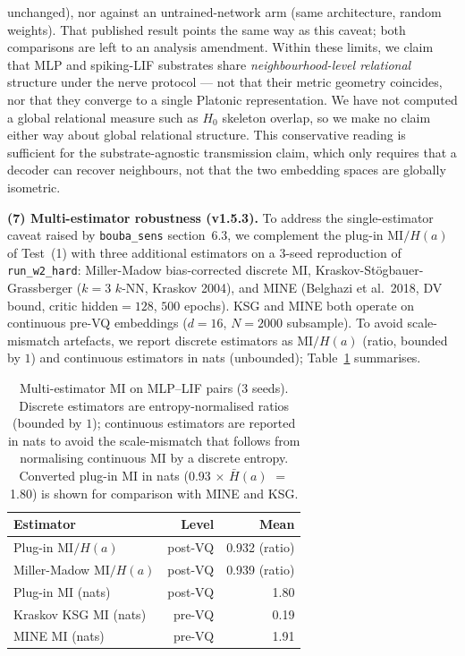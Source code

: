 \documentclass[10pt,twocolumn]{article}
\begin{document}
unchanged), nor against an untrained-network arm (same architecture,
random weights). That published result points the same way as this
caveat; both comparisons are left to an analysis amendment. Within these limits, we claim
that MLP and spiking-LIF substrates share \emph{neighbourhood-level
relational} structure under the nerve protocol --- not that their
metric geometry coincides, nor that they converge to a single Platonic
representation. We have not computed a global relational measure such
as $H_0$ skeleton overlap, so we make no claim either way about global
relational structure. This conservative reading is sufficient for the
substrate-agnostic transmission claim, which only requires that a
decoder can recover neighbours, not that the two embedding spaces are
globally isometric.

\textbf{(7) Multi-estimator robustness (v1.5.3).} To address the
single-estimator caveat raised by \texttt{bouba\_sens} section~6.3,
we complement the plug-in $\mathrm{MI}/H(a)$ of Test~(1) with three
additional estimators on a 3-seed reproduction of
\texttt{run\_w2\_hard}: Miller-Madow bias-corrected discrete MI,
Kraskov-St\"ogbauer-Grassberger ($k{=}3$ $k$-NN, Kraskov 2004), and
MINE (Belghazi et al.\ 2018, DV bound, critic hidden${=}128$,
$500$ epochs). KSG and MINE both operate on continuous pre-VQ
embeddings ($d{=}16$, $N{=}2000$ subsample). To avoid
scale-mismatch artefacts, we report discrete estimators as
$\mathrm{MI}/H(a)$ (ratio, bounded by $1$) and continuous
estimators in nats (unbounded); Table~\ref{tab:mi-multi} summarises.

\begin{table}[t]
  \centering
  \caption{Multi-estimator MI on MLP--LIF pairs (3 seeds).
  Discrete estimators are entropy-normalised ratios (bounded by
  $1$); continuous estimators are reported in nats to avoid the
  scale-mismatch that follows from normalising continuous MI by
  a discrete entropy. Converted plug-in MI in nats (0.93 $\times$
  $\bar H(a)$ $=$ 1.80) is shown for comparison with MINE and KSG.}
  \label{tab:mi-multi}
  \small
  \begin{tabular}{lrr}
    \hline
    Estimator & Level & Mean \\
    \hline
    Plug-in $\mathrm{MI} / H(a)$      & post-VQ & 0.932 (ratio) \\
    Miller-Madow $\mathrm{MI} / H(a)$ & post-VQ & 0.939 (ratio) \\
    Plug-in MI (nats)                 & post-VQ & 1.80 \\
    Kraskov KSG MI (nats)             & pre-VQ  & 0.19 \\
    MINE MI (nats)                    & pre-VQ  & 1.91 \\
    \hline
  \end{tabular}
\end{table}
\end{document}
